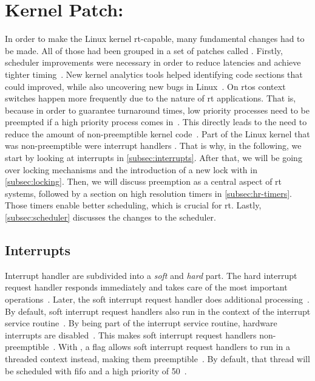 \documentclass[10pt,twocolumn,a4paper]{article}
\begin{document}
\section{Kernel Patch: }
In order to make the Linux kernel \acrshort{rt}-capable, many fundamental changes had to be made.
All of those had been grouped in a set of patches called .
Firstly, scheduler improvements were necessary in order to reduce latencies and achieve tighter timing~\cite{mckenney_realtime_2005}.
New kernel analytics tools helped identifying code sections that could improved, while also uncovering new bugs in Linux~\cite{reghenzani_realtime_2019}.
On \acrshort{rtos} context switches happen more frequently due to the nature of \acrshort{rt} applications.
That is, because in order to guarantee turnaround times, low priority processes need to be preempted if a high priority process comes in~\cite{buttazzo_hard_1997}.
This directly leads to the need to reduce the amount of non-preemptible kernel code~\cite{reghenzani_realtime_2019}.
Part of the Linux kernel that was non-preemptible were interrupt handlers \cite{reghenzani_realtime_2019}.
That is why, in the following, we start by looking at interrupts in \autoref{subsec:interrupts}.
After that, we will be going over locking mechanisms and the introduction of a new lock with  in \autoref{subsec:locking}.
Then, we will discuss preemption as a central aspect of \acrshort{rt} systems, followed by a section on high resolution timers in \autoref{subsec:hr-timers}.
Those timers enable better scheduling, which is crucial for \acrshort{rt}.
Lastly, \autoref{subsec:scheduler} discusses the changes to the scheduler.

\subsection{Interrupts}\label{subsec:interrupts}
Interrupt handler are subdivided into a \emph{soft} and \emph{hard} part.
The hard interrupt request handler responds immediately and takes care of the most important operations~\cite{reghenzani_realtime_2019}.
Later, the soft interrupt request handler does additional processing~\cite{reghenzani_realtime_2019}.
By default, soft interrupt request handlers also run in the context of the interrupt service routine~\cite{lf:irq}.
By being part of the interrupt service routine, hardware interrupts are disabled~\cite{lf:irq}.
This makes soft interrupt request handlers non-preemptible~\cite{lf:irq}.
With , a flag allows soft interrupt request handlers to run in a threaded context instead, making them preemptible~\cite{reghenzani_realtime_2019, lf:irq}.
By default, that thread will be scheduled with \acrfull{fifo} and a high priority of 50~\cite{lf:irq}.
\end{document}
